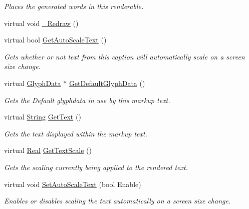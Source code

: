 \begin{DoxyCompactItemize}
\begin{DoxyCompactList}\small\item\em Places the generated words in this renderable. \item\end{DoxyCompactList}\item 
virtual void \hyperlink{classMezzanine_1_1UI_1_1MarkupText_a40beb1a89e01e9d3cbdfa939969e44ce}{\_\-Redraw} ()
\item 
virtual bool \hyperlink{classMezzanine_1_1UI_1_1MarkupText_a7ce89b8725dbb2ccecf1c363d61d048f}{GetAutoScaleText} ()
\begin{DoxyCompactList}\small\item\em Gets whether or not text from this caption will automatically scale on a screen size change. \item\end{DoxyCompactList}\item 
virtual \hyperlink{classMezzanine_1_1UI_1_1GlyphData}{GlyphData} $\ast$ \hyperlink{classMezzanine_1_1UI_1_1MarkupText_a730f80ff30ebbba68700d7b0d8570106}{GetDefaultGlyphData} ()
\begin{DoxyCompactList}\small\item\em Gets the Default glyphdata in use by this markup text. \item\end{DoxyCompactList}\item 
virtual \hyperlink{namespaceMezzanine_acf9fcc130e6ebf08e3d8491aebcf1c86}{String} \hyperlink{classMezzanine_1_1UI_1_1MarkupText_ae04d70b952a2816e429b756b8d4f4ded}{GetText} ()
\begin{DoxyCompactList}\small\item\em Gets the text displayed within the markup text. \item\end{DoxyCompactList}\item 
virtual \hyperlink{namespaceMezzanine_a726731b1a7df72bf3583e4a97282c6f6}{Real} \hyperlink{classMezzanine_1_1UI_1_1MarkupText_a0d8c33512d2b434fd9f1a4f22cb76320}{GetTextScale} ()
\begin{DoxyCompactList}\small\item\em Gets the scaling currently being applied to the rendered text. \item\end{DoxyCompactList}\item 
virtual void \hyperlink{classMezzanine_1_1UI_1_1MarkupText_a3b605ec081d188cae19ed3e677f65072}{SetAutoScaleText} (bool Enable)
\begin{DoxyCompactList}\small\item\em Enables or disables scaling the text automatically on a screen size change. \item\end{DoxyCompactList}\item 

\end{DoxyCompactItemize}
